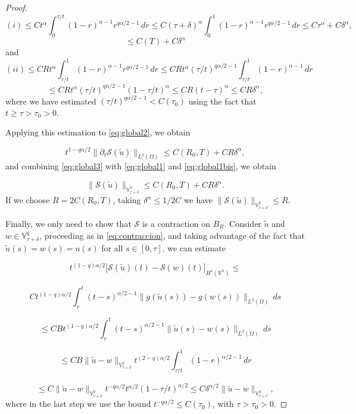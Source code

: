 \documentclass{amsart}
\newcommand{\rn}{{\mathbb{R}^n}}
\newcommand{\ele}{L^2(\Omega)}
\newcommand{\fmonio}{g}
\newcommand{\V}{\mathbb{V}^q}
\theoremstyle{remark}
\theoremstyle{definition}
\numberwithin{equation}{section}
\begin{document}
\begin{proof}
$$
(i) \leq Ct^{\alpha}\int^{\tau/t}_{0} (1-r)^{\alpha-1} r^{q\alpha/2-1}\,dr \leq 
C(\tau + \delta)^{\alpha} \int^{1}_{0} (1-r)^{\alpha-1} r^{q\alpha/2-1}\,dr \leq C\tau^{\alpha} + C\delta^{\alpha},
$$
$$\leq C(T) + C\delta^{\alpha} $$
and
$$
(ii) \leq CRt^{\alpha}\int^{1}_{\tau/t} (1-r)^{\alpha-1} r^{q\alpha/2-1}\,dr \leq 
CRt^{\alpha}  (\tau/t)^{q\alpha/2-1}\int^{1}_{\tau/t} (1-r)^{\alpha-1}\,dr
$$
$$
\leq CRt^{\alpha}  (\tau/t)^{q\alpha/2-1}(1-\tau/t)^{\alpha} \leq CR(t-\tau)^{\alpha} \leq CR\delta^{\alpha},
$$
where we have estimated $(\tau/t)^{q\alpha/2-1}<C(\tau_0)$ using the fact that $t \geq \tau>\tau_0>0$.  

Applying this estimation to \eqref{eq:global2},  we obtain

\begin{equation}
\label{eq:global3}
t^{1-q\alpha/2}\|\partial_t \mathcal{S}(\tilde{u})\|_{\ele} \leq C(R_0,T) +  CR\delta^{\alpha}, 
\end{equation}  
and combining \eqref{eq:global3} with \eqref{eq:global1} and \eqref{eq:global1bis}, we obtain

$$ \| \mathcal{S}(\tilde{u})\|_{\V_{\tau+\delta}} \leq C(R_0,T) +  CR\delta^{\alpha}.$$
If we choose $R = 2C(R_0,T)$, taking $\delta^{\alpha}\leq 1/2C$ we have $\| \mathcal{S}(\tilde{u})\|_{\V_{\tau+\delta}} \leq R$. 

Finally, we only need to show that $\mathcal{S}$ is a contraction on $B_R$. Consider $\tilde{u}$ and $w \in \V_{\tau+\delta}$, proceeding as in \eqref{eq:contraccion}, and taking advantage of the fact that $\tilde{u}(s)=w(s)=u(s)$ for all $s \in [0,\tau]$, we can estimate 


\begin{equation}
\label{eq:contraccion_gblogal}
 t^{(1-q)\alpha/2}|\mathcal{S}(\tilde{u})(t) - \mathcal{S}(w)(t)  |_{H^s(\rn)} \leq   
\end{equation}

$$
Ct^{(1-q)\alpha/2}\int^{t}_{\tau} (t-s)^{\alpha/2 - 1}\|\fmonio(\tilde{u}(s)) - \fmonio(w(s))\|_{\ele}\,ds
$$

$$\leq CBt^{(1-q)\alpha/2}\int^{t}_{\tau} (t-s)^{\alpha/2 - 1}\|\tilde{u}(s) - w(s)\|_{\ele}\,ds  $$

$$\leq CB\|\tilde{u} - w\|_{\V_{\tau + \delta}} t^{(2-q)\alpha/2}\int^{1}_{\tau/t} (1-r)^{\alpha/2 - 1}\,dr  $$

$$\leq C\|\tilde{u} - w\|_{\V_{\tau+\delta}}t^{-q\alpha/2}t^{\alpha/2}(1-\tau/t)^{\alpha/2} \leq C\delta^{\alpha/2}\|\tilde{u} - w\|_{\V_{\tau + \delta}}, $$
where in the last step we use the bound  $t^{-q\alpha/2} \leq C(\tau_0)$, with $\tau > \tau_0 > 0$.  
 


\end{proof}
\end{document}
